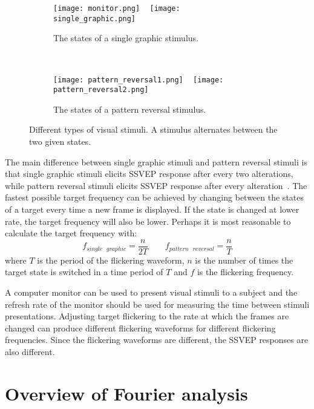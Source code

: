 \begin{figure}[h!]
	\centering
	\begin{subfigure}{0.48\textwidth}
		\texttt{[image: monitor.png]}
		~
		\texttt{[image: single\_graphic.png]}
		\caption{The states of a single graphic stimulus.}
	\end{subfigure}
	~
	\begin{subfigure}{0.48\textwidth}
		\texttt{[image: pattern\_reversal1.png]}
		~
		\texttt{[image: pattern\_reversal2.png]}
		\caption{The states of a pattern reversal stimulus.}
	\end{subfigure}
	\caption{Different types of visual stimuli. A stimulus alternates between the two given states.}
	\label{fig:stimuli}
\end{figure}

The main difference between \gls{single graphic} stimuli and \gls{pattern reversal} stimuli is that \gls{single graphic} stimuli elicits \gls{SSVEP} response after every two alterations, while \gls{pattern reversal} stimuli elicits \gls{SSVEP} response after every alteration~\cite{ssvep_stim}. The fastest possible target frequency can be achieved by changing between the \glspl{state} of a target every time a new \gls{frame} is displayed. If the \gls{state} is changed at lower rate, the \gls{target} frequency will also be lower. Perhaps it is most reasonable to calculate the \gls{target} frequency with:
\begin{equation}
	f_{single\mbox{ }graphic} = \frac{n}{2T} \qquad f_{pattern\mbox{ }reversal} = \frac{n}{T}
\end{equation}
where $T$ is the period of the \gls{flickering waveform}, $n$ is the number of times the \gls{target} \gls{state} is switched in a time period of $T$ and $f$ is the \gls{flickering} frequency.

A computer monitor can be used to present visual stimuli to a subject and the \gls{refresh rate} of the monitor should be used for measuring the time between stimuli presentations. Adjusting \gls{target} \gls{flickering} to the rate at which the \glspl{frame} are changed can produce different \glspl{flickering waveform} for different \gls{flickering} frequencies. Since the \glspl{flickering waveform} are different, the \gls{SSVEP} responses are also different.

\section{Overview of Fourier analysis}
\label{sec:fourier}

